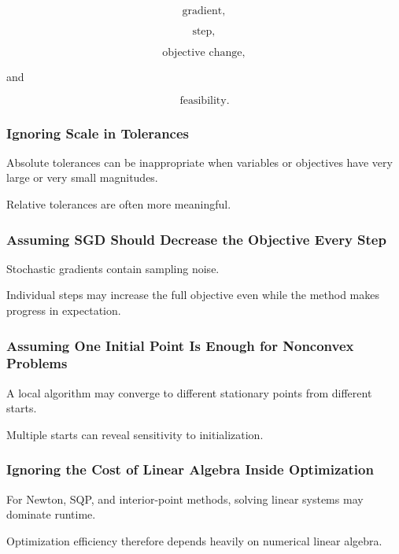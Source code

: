 \[
\boxed{
\text{gradient},
}
\]

\[
\boxed{
\text{step},
}
\]

\[
\boxed{
\text{objective change},
}
\]

and

\[
\boxed{
\text{feasibility}.
}
\]

\subsubsection{Ignoring Scale in Tolerances}

Absolute tolerances can be inappropriate when variables or objectives have
very large or very small magnitudes.

Relative tolerances are often more meaningful.

\subsubsection{Assuming SGD Should Decrease the Objective Every Step}

Stochastic gradients contain sampling noise.

Individual steps may increase the full objective even while the method
makes progress in expectation.

\subsubsection{Assuming One Initial Point Is Enough for Nonconvex Problems}

A local algorithm may converge to different stationary points from
different starts.

Multiple starts can reveal sensitivity to initialization.

\subsubsection{Ignoring the Cost of Linear Algebra Inside Optimization}

For Newton, SQP, and interior-point methods, solving linear systems may
dominate runtime.

Optimization efficiency therefore depends heavily on numerical linear
algebra.

